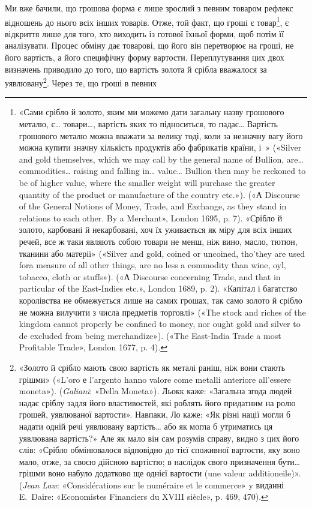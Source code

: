 Ми вже бачили, що грошова форма є лише зрослий з певним
товаром рефлекс відношень до нього всіх інших товарів. Отже,
той факт, що гроші є товар\footnote{
«Сами срібло й золото, яким ми можемо дати загальну назву грошового
металю, є\dots{} товари\dots{}, вартість яких то підноситься, то падає\dots{}
Вартість грошового металю можна вважати за велику тоді, коли за
незначну вагу його можна купити значну кількість продуктів або фабрикатів
 країни, і~» («Silver and gold themselves, which we may call
by the general name of Bullion, are\dots{} commodities\dots{} raising and falling
in\dots{} value\dots{} Bullion then may be reckoned to be of higher value, where
the smaller weight will purchase the greater quantity of the product or
manufacture of the country etc.»). («А Discourse of the General Notions
of Money, Trade, and Exchange, as they stand in relations to each other.
By a Merchant», London 1695, p. 7). «Срібло й золото, карбовані й некарбовані,
хоч їх уживається як міру для всіх інших речей, все ж таки
являють собою товари не менш, ніж вино, масло, тютюн, тканини або матерії»
(«Silver and gold, coined or uncoined, tho’they are used fora measure
of all other things, are no less a commodity than wine, oyl, tobacco,
cloth or stuffs»). («А Discourse concerning Trade, and that in particular
of the East-Indies etc.», London 1689, p. 2). «Капітал і багатство королівства
не обмежується лише на самих грошах, так само золото й срібло
не можна вилучити з числа предметів торговлі» («The stock and riches
of the kingdom cannot properly be confined to money, nor ought gold and
silver to de excluded from being merchandize»). («The East-India Trade
a most Profitable Trade», London 1677, p. 4).
}, є відкриття лише для того, хто
виходить із готової їхньої форми, щоб потім її аналізувати. Процес
обміну дає товарові, що його він перетворює на гроші, не його
вартість, а його специфічну форму вартости. Переплутування
цих двох визначень приводило до того, що вартість золота й
срібла вважалося за уявлювану\footnote{
«Золото й срібло мають свою вартість як металі раніш, ніж вони
стають грішми» («L’oro е l’argento hanno valore come metalli anteriore
all’essere moneta»). (\emph{Galiani}: «Della Moneta»). Льокк каже: «Загальна
згода людей надає сріблу задля його властивостей, які роблять
його придатним на ролю грошей, уявлюваної вартости». Навпаки, Ло
каже: «Як різні нації могли б надати одній речі уявлювану вартість\dots{}
або як могла б утриматись ця уявлювана вартість?» Але як мало він сам
розумів справу, видно з цих його слів: «Срібло обмінювалося відповідно
до тієї споживної вартости, яку воно мало, отже, за своєю дійсною вартістю;
в наслідок свого призначення бути\dots{} грішми воно набуло додатково
ще однієї вартости (une valeur additioneile)». (\emph{Jean Law}: «Considérations
sur le numéraire et le commerce» y виданні E.~Daire: «Economistes
Financiers du XVIII siècle», p. 469, 470).
}. Через те, що гроші в певних
